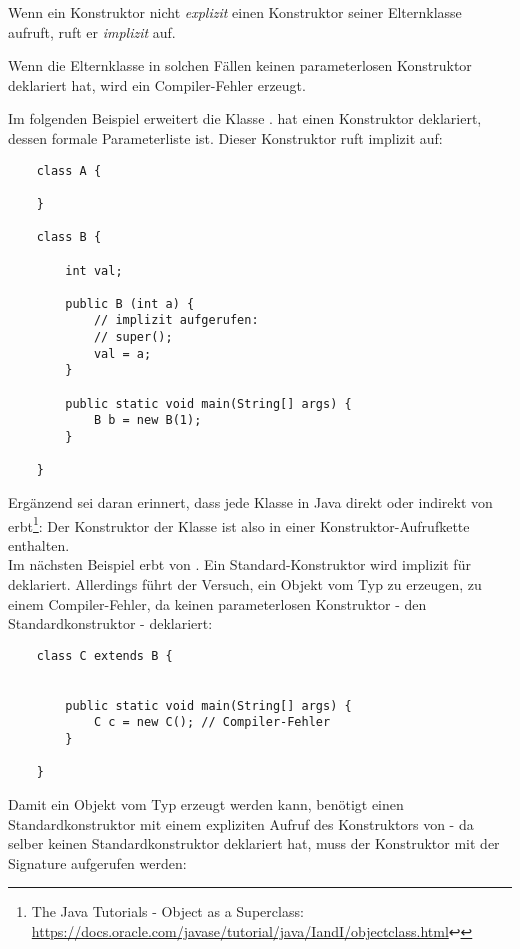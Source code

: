 \noindent
Wenn ein Konstruktor nicht \textit{explizit} einen Konstruktor seiner Elternklasse aufruft, ruft er \textit{implizit}  auf.

\noindent
Wenn die Elternklasse in solchen Fällen keinen parameterlosen Konstruktor deklariert hat, wird ein Compiler-Fehler erzeugt.

\noindent
Im folgenden Beispiel erweitert  die Klasse .  hat einen Konstruktor deklariert, dessen
formale Parameterliste  ist. Dieser Konstruktor ruft implizit  auf:

\begin{verbatim}
    class A {

    }

    class B {

        int val;

        public B (int a) {
            // implizit aufgerufen:
            // super();
            val = a;
        }

        public static void main(String[] args) {
            B b = new B(1);
        }

    }
\end{verbatim}

\noindent
Ergänzend sei daran erinnert, dass jede Klasse in Java direkt oder indirekt von  erbt\footnote{
    The Java Tutorials - Object as a Superclass: \url{https://docs.oracle.com/javase/tutorial/java/IandI/objectclass.html}↩
}: Der Konstruktor der Klasse  ist also in einer Konstruktor-Aufrufkette enthalten.\\

\noindent
Im nächsten Beispiel erbt   von . Ein Standard-Konstruktor wird implizit für  deklariert. Allerdings
führt der Versuch, ein Objekt vom Typ  zu erzeugen, zu einem Compiler-Fehler, da  keinen parameterlosen
Konstruktor - den Standardkonstruktor - deklariert:


\begin{verbatim}
    class C extends B {


        public static void main(String[] args) {
            C c = new C(); // Compiler-Fehler
        }

    }
\end{verbatim}

\noindent
Damit ein Objekt vom Typ  erzeugt werden kann, benötigt  einen Standardkonstruktor mit einem expliziten
Aufruf des Konstruktors von  - da  selber keinen Standardkonstruktor deklariert hat, muss der Konstruktor
mit der Signature  aufgerufen werden:

